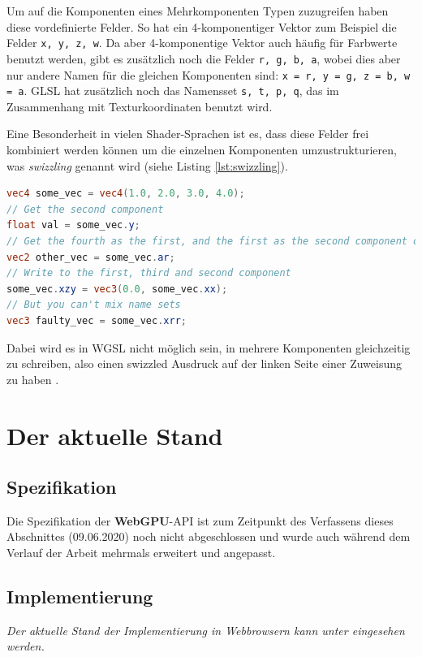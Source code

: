 \documentclass[oneside]{ausarbeitung}
\newcommand*{\quotize}[1]{\glqq #1\grqq}
\begin{document}
Um auf die Komponenten eines Mehrkomponenten Typen zuzugreifen haben diese vordefinierte Felder. So hat ein 4-komponentiger Vektor zum Beispiel die Felder \texttt{x, y, z, w}. Da aber 4-komponentige Vektor auch häufig für Farbwerte benutzt werden, gibt es zusätzlich noch die Felder \texttt{r, g, b, a}, wobei dies aber nur andere Namen für die gleichen Komponenten sind: \texttt{x = r, y = g, z = b, w = a}. GLSL hat zusätzlich noch das Namensset \texttt{s, t, p, q}, das im Zusammenhang mit Texturkoordinaten benutzt wird.

Eine Besonderheit in vielen Shader-Sprachen ist es, dass diese Felder frei kombiniert werden können um die einzelnen Komponenten umzustrukturieren, was \textit{swizzling} \cite{wikipedia:swizzling} genannt wird (siehe Listing \ref{lst:swizzling}).

\begin{minipage}{\textwidth}
\begin{lstlisting}[language=GLSL, label={lst:swizzling}, caption={\quotize{Swizzling} von Komponenten in GLSL}]
vec4 some_vec = vec4(1.0, 2.0, 3.0, 4.0);
// Get the second component
float val = some_vec.y;
// Get the fourth as the first, and the first as the second component of a new vec2
vec2 other_vec = some_vec.ar; 
// Write to the first, third and second component
some_vec.xzy = vec3(0.0, some_vec.xx);
// But you can't mix name sets
vec3 faulty_vec = some_vec.xrr;
\end{lstlisting}
\end{minipage}

Dabei wird es in WGSL nicht möglich sein, in mehrere Komponenten gleichzeitig zu schreiben, also einen \quotize{swizzled} Ausdruck auf der linken Seite einer Zuweisung zu haben \cite[Vgl.][Typed Storage]{w3:wgsl}.

\section{Der aktuelle Stand}
\subsection{Spezifikation}
Die Spezifikation \cite{w3:webgpu} der \textbf{WebGPU}-\ac{API} ist zum Zeitpunkt des Verfassens dieses Abschnittes (09.06.2020) noch nicht abgeschlossen und wurde auch während dem Verlauf der Arbeit mehrmals erweitert und angepasst.

\subsection{Implementierung}
\textit{Der aktuelle Stand der Implementierung in Webbrowsern kann unter \cite{webgpu:implementation_status} eingesehen werden.}
\end{document}
